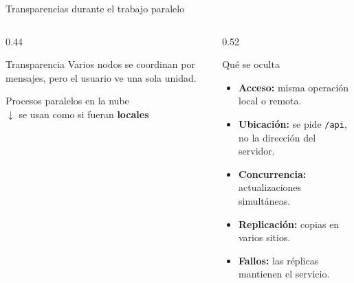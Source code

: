 \renewcommand{\fuentespie}{Fuentes: \cite{hbFreitas2025,hbArjona2023,hbAngularProxy}}
\begin{frame}{Transparencias durante el trabajo paralelo}
  \begin{columns}[T,onlytextwidth]
    \begin{column}{0.44\textwidth}
      \begin{block}{Transparencia}
        Varios nodos se coordinan por mensajes, pero el usuario ve una sola unidad.~\cite{hbFreitas2025}
      \end{block}

      \vspace{0.8em}
      {\small
      Procesos paralelos en la nube\\
      $\downarrow$ se usan como si fueran \textbf{locales}~\cite{hbArjona2023}\par}
    \end{column}

    \begin{column}{0.52\textwidth}
      \begin{block}{Qué se oculta}
        \small
        \begin{itemize}
          \item \textbf{Acceso:} misma operación local o remota.~\cite{hbArjona2023}
          \item \textbf{Ubicación:} se pide \texttt{/api}, no la dirección del servidor.~\cite{hbAngularProxy}
          \item \textbf{Concurrencia:} actualizaciones simultáneas.~\cite{hbFreitas2025}
          \item \textbf{Replicación:} copias en varios sitios.~\cite{hbFreitas2025}
          \item \textbf{Fallos:} las réplicas mantienen el servicio.~\cite{hbFreitas2025}
        \end{itemize}
      \end{block}
    \end{column}
  \end{columns}
\end{frame}
\renewcommand{\fuentespie}{Fuentes: [PENDIENTE]}

